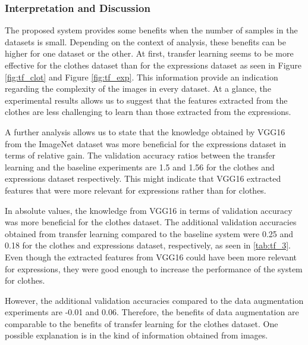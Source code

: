 \documentclass{article}
\begin{document}
\subsubsection{\textbf{Interpretation and Discussion}}

The proposed system provides some benefits when the number of samples in the datasets is small. Depending on the context of analysis, these benefits can be higher for one dataset or the other. At first, transfer learning seems to be more effective for the clothes dataset than for the expressions dataset as seen in Figure \ref{fig:tf_clot} and Figure \ref{fig:tf_exp}. This information provide an indication regarding the complexity of the images in every dataset. At a glance, the experimental results allows us to suggest that the features extracted from the clothes are less challenging to learn than those extracted from the expressions.


\addtocounter{footnote}{-2}
\addtocounter{footnote}{1}
\addtocounter{footnote}{1}


A further analysis allows us to state that the knowledge obtained by VGG16 from the ImageNet dataset was more beneficial for the expressions dataset in terms of relative gain. The validation accuracy ratios between the transfer learning and the baseline experiments are 1.5 and 1.56 for the clothes and expressions dataset respectively. This might indicate that VGG16 extracted features that were more relevant for expressions rather than for clothes.

In absolute values, the knowledge from VGG16 in terms of validation accuracy was more beneficial for the clothes dataset. The additional validation accuracies obtained from transfer learning compared to the baseline system were 0.25 and 0.18 for the clothes and expressions dataset, respectively, as seen in \ref{tab:tf_3}. Even though the extracted features from VGG16 could have been more relevant for expressions, they were good enough to increase the performance of the system for clothes.

However, the additional validation accuracies compared to the data augmentation experiments are -0.01 and 0.06. Therefore, the benefits of data augmentation are comparable to the benefits of transfer learning for the clothes dataset. One possible explanation is in the kind of information obtained from images. 
\end{document}
